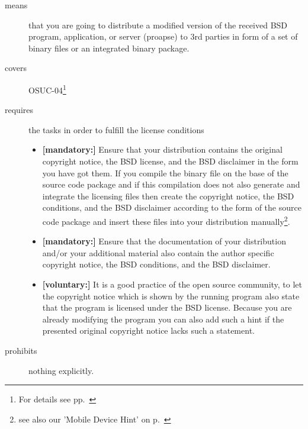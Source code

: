 \begin{description}
\item[means] that you are going to distribute a modified version of the received
BSD pro\-gram, application, or server (proapse) to 3rd parties in form of a set
of binary files or an integrated binary package.
\item[covers] OSUC-04\footnote{For details see pp.\ \pageref{OSUC-04-DEF}}
\item[requires] the tasks in order to fulfill the license conditions
\begin{itemize}

  \item  \textbf{[mandatory:]} Ensure that your distribution contains the
  original copyright notice, the BSD license, and the BSD disclaimer in the form
  you have got them. If you compile the binary file on the base of the source
  code package and if this compilation does not also generate and integrate the
  licensing files then create the copyright notice, the BSD conditions, and the
  BSD disclaimer according to the form of the source code package and insert
  these files into your distribution manually\footnote{see also our 'Mobile
  Device Hint' on p.\ \pageref{MobileDeviceHint}}.

  \item  \textbf{[mandatory:]} Ensure that the documentation of your
  distribution and/or your additional material also contain the author specific
  copyright notice, the BSD conditions, and the BSD disclaimer.
  
  \item \textbf{[voluntary:]} It is a good practice of the open source
  community, to let the copyright notice which is shown by the running program
  also state that the program is licensed under the BSD license. Because you are
  already modifying the program you can also add such a hint if the presented
  original copyright notice lacks such a statement.
\end{itemize}
\item[prohibits] nothing explicitly.
\end{description}

